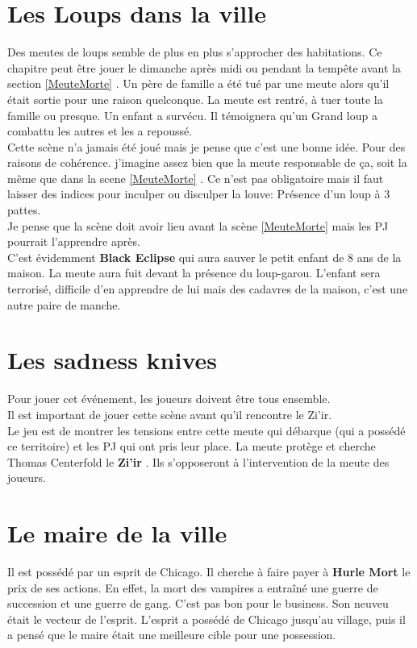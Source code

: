 \documentclass[oneside,12pt]{book}
\newcommand{\Peter}{\textbf{Hurle Mort} }
\newcommand{\BlackEclipse}{\textbf{Black Eclipse} }
\newcommand{\Thomas}{\textbf{Zi'ir} }
\begin{document}
\begin{flushleft}
\section{Les Loups dans la ville}
Des meutes de loups semble de plus en plus s'approcher des habitations. Ce chapitre peut être jouer le dimanche après midi ou pendant la tempête avant la section \ref{MeuteMorte} .
Un père de famille a été tué par une meute alors qu'il était sortie pour une raison quelconque. 
La meute est rentré, à tuer toute la famille ou presque. Un enfant a survécu. Il témoignera qu'un Grand loup a combattu les autres et les a repoussé.\\
Cette scène n'a jamais été joué mais je pense que c'est une bonne idée. Pour des raisons de cohérence. j'imagine assez bien que la meute responsable de ça, soit la même que dans la scene \ref{MeuteMorte} . Ce n'est pas obligatoire mais il faut laisser des indices pour inculper ou disculper la louve: Présence d'un loup à 3 pattes. \\ 
Je pense que la scène doit avoir lieu avant la scène \ref{MeuteMorte} mais les PJ pourrait l'apprendre après.  \\
C'est évidemment \BlackEclipse qui aura sauver le petit enfant de 8 ans de la maison. La meute aura fuit devant la présence du loup-garou. L'enfant sera terrorisé, difficile d'en apprendre de lui mais des cadavres de la maison, c'est une autre paire de manche. 

\section{Les sadness knives}
\label{sadness}
Pour jouer cet événement, les joueurs doivent être tous ensemble.\\
Il est important de jouer cette scène avant qu'il rencontre le Zi'ir.\\ 
Le jeu est de montrer les tensions entre cette meute qui débarque (qui a possédé ce territoire) et les PJ qui ont pris leur place.
La meute protège et cherche Thomas Centerfold le \Thomas . Ils s'opposeront à l'intervention de la meute des joueurs.


\section{Le maire de la ville}
\label{le_maire}
Il est possédé par un esprit de Chicago. Il cherche à faire payer à \Peter le prix de ses actions. En effet, la mort des vampires a entraîné une guerre de succession et une guerre de gang. C'est pas bon pour le business. Son neuveu était le vecteur de l'esprit.
L'esprit a possédé \Julian de Chicago jusqu'au village, puis il a pensé que le maire était une meilleure cible pour une possession. 

\end{flushleft}
\end{document}

